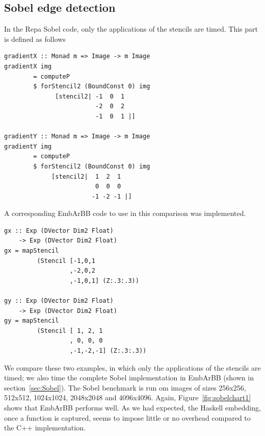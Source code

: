 \subsection{Sobel edge detection}
In the Repa Sobel code, only the applications of the stencils are timed. This 
part is defined as follows 
\begin{verbatim}
gradientX :: Monad m => Image -> m Image
gradientX img
        = computeP
        $ forStencil2 (BoundConst 0) img
              [stencil2| -1  0  1
                         -2  0  2
                         -1  0  1 |]

gradientY :: Monad m => Image -> m Image
gradientY img
        = computeP
        $ forStencil2 (BoundConst 0) img
             [stencil2|  1  2  1
                         0  0  0
                        -1 -2 -1 |] 
\end{verbatim}

A corresponding EmbArBB code to use in this comparison was implemented.




\begin{verbatim} 
gx :: Exp (DVector Dim2 Float) 
    -> Exp (DVector Dim2 Float)  
gx = mapStencil 
         (Stencil [-1,0,1
                  ,-2,0,2
                  ,-1,0,1] (Z:.3:.3)) 

gy :: Exp (DVector Dim2 Float) 
    -> Exp (DVector Dim2 Float) 
gy = mapStencil 
         (Stencil [ 1, 2, 1
                  , 0, 0, 0
                  ,-1,-2,-1] (Z:.3:.3))
\end{verbatim}


We compare these two examples, in which only the applications of the stencils
are timed; we also time the complete Sobel implementation in EmbArBB (shown
in section~\ref{sec:Sobel}).
The Sobel benchmark is run om images of sizes 256x256, 512x512, 1024x1024, 2048x2048 and 4096x4096.
Again, Figure~\ref{fig:sobelchart1} shows that EmbArBB performs well.  As we had expected, the 
Haskell embedding, once a function is captured, seems to impose little or no overhead 
compared to the C++ implementation.


